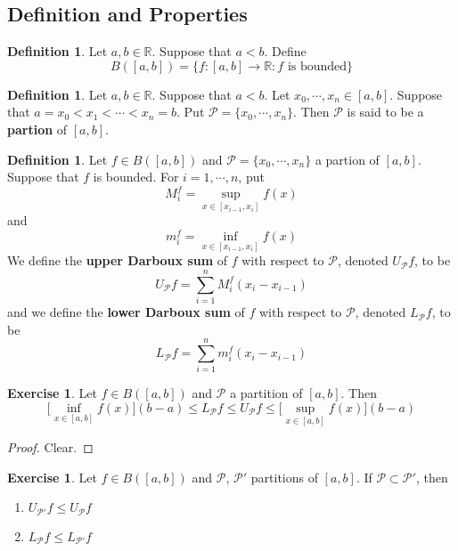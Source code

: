 \documentclass[12pt]{amsart}
\theoremstyle{definition}
\newtheorem{defn}[definition]{Definition}
\newtheorem{ex}[definition]{Exercise}
\newcommand{\R}{\mathbb{R}}
\newcommand{\MP}{\mathcal{P}}
\begin{document}
	\subsection{Definition and Properties}
	\begin{defn}
		Let $a,b \in \R$. Suppose that $a<b$. Define $$B([a,b]) = \{f:[a,b] \rightarrow \R: f\text{ is bounded}\}$$
	\end{defn}
	
	\begin{defn}
		Let $a,b \in \R$. Suppose that $a<b$. Let $x_0, \cdots, x_n \in [a,b]$. Suppose that $a= x_0 < x_1 < \cdots < x_n = b$. Put $\MP = \{x_0, \cdots, x_n\}$. Then $\MP$ is said to be a \textbf{partion} of $[a,b]$. 
	\end{defn}
	
	\begin{defn}
		Let $f \in B([a,b])$ and $\MP = \{x_0, \cdots, x_n\}$ a partion of $[a,b]$. Suppose that $f$ is bounded. For $i = 1, \cdots, n$, put 
		$$M^f_i = \sup_{x \in [x_{i-1}, x_i]} f(x)$$ and 
		$$m^f_i = \inf_{x \in [x_{i-1}, x_i]} f(x)$$ 
		We define the \textbf{upper Darboux sum} of $f$ with respect to $\MP$, denoted $U_\MP f$, to be $$U_\MP f = \sum_{i=1}^n M^f_i (x_i - x_{i-1})$$ 
		and we define the \textbf{lower Darboux sum} of $f$ with respect to $\MP$, denoted $L_\MP f$, to be
		$$L_\MP f = \sum_{i=1}^n m^f_i (x_i - x_{i-1})$$ 
	\end{defn}

	\begin{ex}
		Let $f \in B([a,b])$ and $\MP$ a partition of $[a,b]$. Then $$\bigg[\inf_{x \in [a,b]} f(x) \bigg] (b-a) \leq L_\MP f \leq U_\MP f \leq \bigg[ \sup_{x \in [a,b]} f(x)  \bigg] (b-a)$$
	\end{ex}

	\begin{proof}
		Clear.
	\end{proof}

	\begin{ex}
			Let $f \in B([a,b])$ and $\MP$, $\MP'$ partitions of $[a,b]$. If $\MP \subset \MP'$, then 
			\begin{enumerate}
				\item $U_{\MP'} f \leq U_{\MP} f$
				\item $L_{\MP} f \leq L_{\MP'} f$
			\end{enumerate}
	\end{ex}
\end{document}
